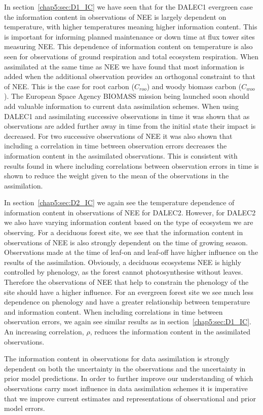 In section~\ref{chap5:sec:D1_IC} we have seen that for the DALEC1 evergreen case the information content in observations of NEE is largely dependent on temperature, with higher temperatures meaning higher information content. This is important for informing planned maintenance or down time at flux tower sites measuring NEE. This dependence of information content on temperature is also seen for observations of ground respiration and total ecosystem respiration. When assimilated at the same time as NEE we have found that most information is added when the additional observation provides an orthogonal constraint to that of NEE. This is the case for root carbon (\(C_{roo}\)) and woody biomass carbon (\(C_{woo}\)). The European Space Agency BIOMASS mission being launched soon should add valuable information to current data assimilation schemes. When using DALEC1 and assimilating successive observations in time it was shown that as observations are added further away in time from the initial state their impact is decreased. For two successive observations of NEE it was also shown that including a correlation in time between observation errors decreases the information content in the assimilated observations. This is consistent with results found in \citet{jarvinen1999variational} where including correlations between observation errors in time is shown to reduce the weight given to the mean of the observations in the assimilation.

In section~\ref{chap5:sec:D2_IC} we again see the temperature dependence of information content in observations of NEE for DALEC2. However, for DALEC2 we also have varying information content based on the type of ecosystem we are observing. For a deciduous forest site, we see that the information content in observations of NEE is also strongly dependent on the time of growing season. Observations made at the time of leaf-on and leaf-off have higher influence on the results of the assimilation. Obviously, a deciduous ecosystems NEE is highly controlled by phenology, as the forest cannot photosynthesise without leaves. Therefore the observations of NEE that help to constrain the phenology of the site should have a higher influence. For an evergreen forest site we see much less dependence on phenology and have a greater relationship between temperature and information content. When including correlations in time between observation errors, we again see similar results as in section~\ref{chap5:sec:D1_IC}. An increasing correlation, \(\rho\), reduces the information content in the assimilated observations. 

The information content in observations for data assimilation is strongly dependent on both the uncertainty in the observations and the uncertainty in prior model predictions. In order to further improve our understanding of which observations carry most influence in data assimilation schemes it is imperative that we improve current estimates and representations of observational and prior model errors.  
